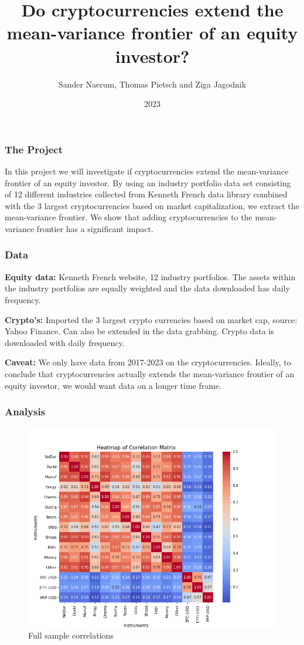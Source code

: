 \documentclass{beamer}
\title{Do cryptocurrencies extend the mean-variance frontier of an equity investor?}
\author{Sander Naerum, Thomas Pietsch and Ziga Jagodnik}
\institute{UZH}
\date{2023}
\begin{document}
\frame{\titlepage}

\begin{frame}
\frametitle{The Project}
In this project we will investigate if cryptocurrencies extend the mean-variance frontier of an equity investor. By using 
an industry portfolio data set consisting of 12 different industries collected from Kenneth French data library combined 
with the 3 largest cryptocurrencies based on market capitalization, we extract the mean-variance frontier. We show that 
adding cryptocurrencies to the mean-variance frontier has a significant impact.
\end{frame}

\begin{frame}
\frametitle{Data}
\textbf{Equity data:} Kenneth French website, 12 industry portfolios. The assets within the industry portfolios are equally 
weighted and the data downloaded has daily frequency. 

\noindent\textbf{Crypto's:} Imported the 3 largest crypto currencies based on market cap, source: Yahoo Finance. Can also be 
extended in the data grabbing. Crypto data is downloaded with daily frequency.  

\noindent \textbf{Caveat:} We only have data from 2017-2023 on the cryptocurrencies. Ideally, to conclude that cryptocurrencies
 actually extends the mean-variance frontier of an equity investor, we would want data on a longer time frame.    
\end{frame}


\begin{frame}
\frametitle{Analysis}
\begin{figure}
    \centering
    \includegraphics[width=0.8\linewidth]{Figures/heatmap_correlation.png}
    \caption{Full sample correlations}
    \label{fig:corr}
\end{figure}
\end{frame}
\end{document}
